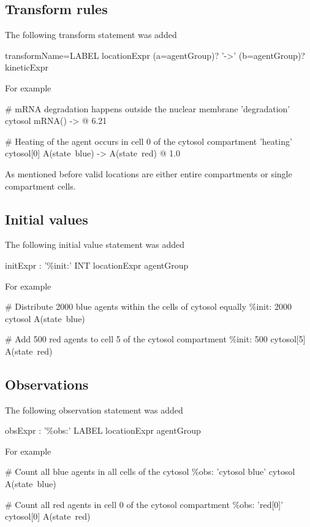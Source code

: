 \subsection{Transform rules}

The following transform statement was added

\begin{bnfsource}
transformName=LABEL locationExpr (a=agentGroup)? '->' (b=agentGroup)? kineticExpr 
\end{bnfsource}
For example
\begin{kappasource}
# mRNA degradation happens outside the nuclear membrane
'degradation' cytosol mRNA() -> @ 6.21

# Heating of the agent occurs in cell 0 of the cytosol compartment
'heating' cytosol[0] A(state~blue) -> A(state~red) @ 1.0
\end{kappasource}

As mentioned before valid locations are either entire compartments or single compartment cells.

\subsection{Initial values}

The following initial value statement was added

\begin{bnfsource}
initExpr :
  '\%init:' INT locationExpr agentGroup
\end{bnfsource}
For example
\begin{kappasource}
# Distribute 2000 blue agents within the cells of cytosol equally
\%init: 2000 cytosol A(state~blue) 

# Add 500 red agents to cell 5 of the cytosol compartment
\%init: 500 cytosol[5] A(state~red) 
\end{kappasource}

\subsection{Observations}

The following observation statement was added

\begin{bnfsource}
obsExpr :
  '\%obs:' LABEL locationExpr agentGroup
\end{bnfsource}
For example
\begin{kappasource}
# Count all blue agents in all cells of the cytosol
\%obs: 'cytosol blue' cytosol A(state~blue)

# Count all red agents in cell 0 of the cytosol compartment
\%obs: 'red[0]' cytosol[0] A(state~red) 
\end{kappasource}

